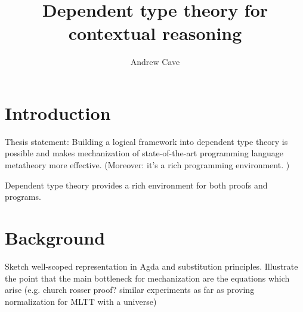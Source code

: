 \documentclass{article}
\author{Andrew Cave}
\title{Dependent type theory for contextual reasoning}
\begin{document}
\maketitle

\section{Introduction}
Thesis statement: Building a logical framework into dependent type
theory is possible and makes mechanization of state-of-the-art programming
language metatheory more effective. (Moreover: it's a rich programming
environment. %
)

Dependent type theory provides a rich environment for both proofs and programs. 

\section{Background}
Sketch well-scoped representation in Agda and substitution
principles. Illustrate the point that the main bottleneck for
mechanization are the equations which arise (e.g. church rosser proof?
similar experiments as far as proving normalization for MLTT with a universe)
\end{document}
